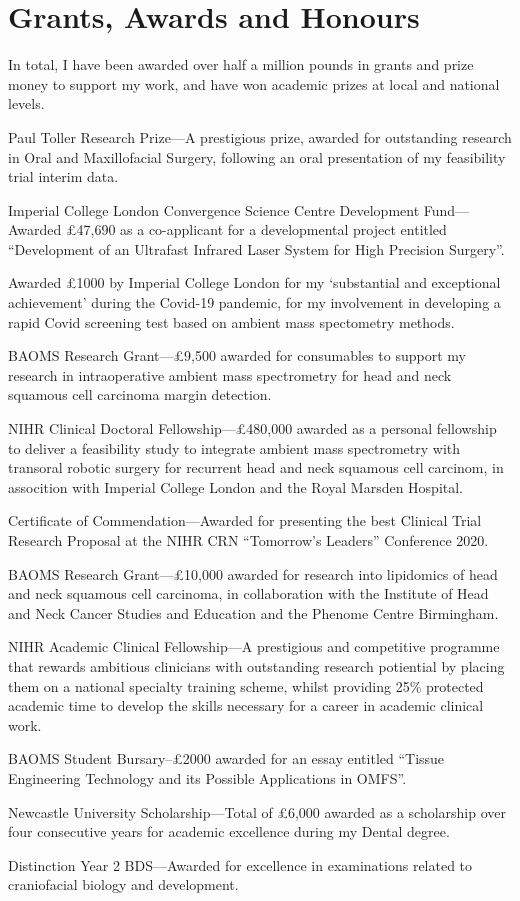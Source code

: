 \section*{Grants, Awards and Honours}

In total, I have been awarded over half a million pounds in grants and prize money to support my work, and have won academic prizes at local and national levels.

 Paul Toller Research Prize---A prestigious prize, awarded for outstanding research in Oral and Maxillofacial Surgery, following an oral presentation of my feasibility trial interim data.

 Imperial College London Convergence Science Centre Development Fund---Awarded \pounds47,690 as a co-applicant for a developmental project entitled ``Development of an Ultrafast Infrared Laser System for High Precision Surgery''.

 Awarded \pounds1000 by Imperial College London for my `substantial and exceptional achievement' during the Covid-19 pandemic, for my involvement in developing a rapid Covid screening test based on ambient mass spectometry methods.

 BAOMS Research Grant---\pounds9,500 awarded for consumables to support my research in intraoperative ambient mass spectrometry for head and neck squamous cell carcinoma margin detection.

 NIHR Clinical Doctoral Fellowship---\pounds480,000 awarded as a personal fellowship to deliver a feasibility study to integrate ambient mass spectrometry with transoral robotic surgery for recurrent head and neck squamous cell carcinom, in assocition with Imperial College London and the Royal Marsden Hospital.

 Certificate of Commendation---Awarded for presenting the best Clinical Trial Research Proposal at the NIHR CRN ``Tomorrow's Leaders'' Conference 2020.

 BAOMS Research Grant---\pounds10,000 awarded for research into lipidomics of head and neck squamous cell carcinoma, in collaboration with the Institute of Head and Neck Cancer Studies and Education and the Phenome Centre Birmingham.

 NIHR Academic Clinical Fellowship---A prestigious and competitive programme that rewards ambitious clinicians with outstanding research potiential by placing them on a national specialty training scheme, whilst providing 25\% protected academic time to develop the skills necessary for a career in academic clinical work.

 BAOMS Student Bursary--£2000 awarded for an essay entitled “Tissue Engineering Technology and its Possible Applications in OMFS”.

 Newcastle University Scholarship---Total of \pounds6,000 awarded as a scholarship over four consecutive years for academic excellence during my Dental degree.

 Distinction Year 2 BDS---Awarded for excellence in examinations related to craniofacial biology and development.
